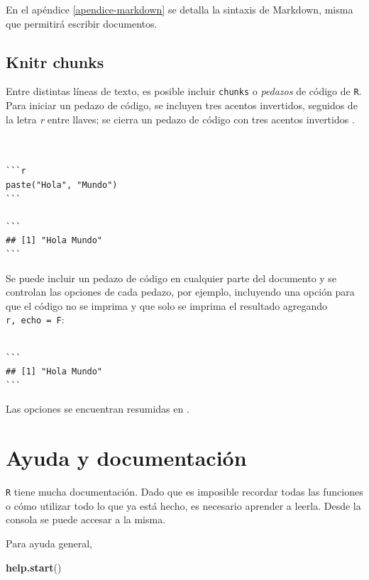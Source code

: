 \documentclass[]{article}
\newenvironment{Shaded}{\begin{snugshade}}{\end{snugshade}}
\newcommand{\KeywordTok}[1]{\textcolor[rgb]{0.13,0.29,0.53}{\textbf{#1}}}
\newcommand{\NormalTok}[1]{#1}
\begin{document}
En el apéndice \ref{apendice-markdown} se detalla la sintaxis de
Markdown, misma que permitirá escribir documentos.

\subsection{Knitr chunks}\label{knitr-chunks}

Entre distintas líneas de texto, es posible incluir \texttt{chunks} o
\emph{pedazos} de código de \texttt{R}. Para iniciar un pedazo de
código, se incluyen tres acentos invertidos, seguidos de la letra
\emph{r} entre llaves; se cierra un pedazo de código con tres acentos
invertidos \parencite{rmarkdownreference}.

\begin{verbatim}


```r
paste("Hola", "Mundo")
```

```
## [1] "Hola Mundo"
```

\end{verbatim}

Se puede incluir un pedazo de código en cualquier parte del documento y
se controlan las opciones de cada pedazo, por ejemplo, incluyendo una
opción para que el código no se imprima y que solo se imprima el
resultado agregando \texttt{r,\ echo\ =\ F}:

\begin{verbatim}

```
## [1] "Hola Mundo"
```
\end{verbatim}

Las opciones se encuentran resumidas en \textcite{rmarkdownreference}.

\section{Ayuda y documentación}\label{ayuda-y-documentacion}

\texttt{R} tiene mucha documentación. Dado que es imposible recordar
todas las funciones o cómo utilizar todo lo que ya está hecho, es
necesario aprender a leerla. Desde la consola se puede accesar a la
misma.

Para ayuda general,

\begin{Shaded}
\begin{Highlighting}[]
\KeywordTok{help.start}\NormalTok{()}
\end{Highlighting}
\end{Shaded}
\end{document}
